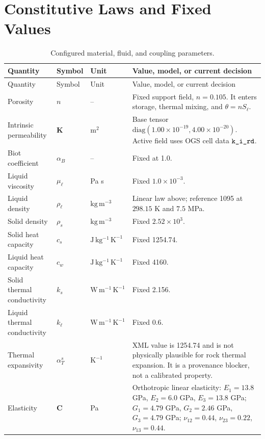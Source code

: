 \documentclass[10pt,a4paper]{article}
\newcommand{\code}[1]{\texttt{\detokenize{#1}}}
\newcommand{\rhoW}{\rho_\ell}
\newcommand{\muW}{\mu_\ell}
\newcommand{\npor}{n}
\newcommand{\Sat}{S_\ell}
\newcommand{\alphaB}{\alpha_B}
\newcommand{\K}{\bm K}
\newcommand{\thetaw}{\theta}
\begin{document}
\section{Constitutive Laws and Fixed Values}

\begin{longtable}{@{}L{0.23\textwidth}L{0.13\textwidth}L{0.14\textwidth}Y@{}}
\caption{Configured material, fluid, and coupling parameters.}\\
\toprule
Quantity & Symbol & Unit & Value, model, or current decision \\
\midrule
\endfirsthead
\toprule
Quantity & Symbol & Unit & Value, model, or current decision \\
\midrule
\endhead
\bottomrule
\endlastfoot
Porosity & \(\npor\) & -- & Fixed support field, \(\npor=0.105\).  It enters storage, thermal mixing, and \(\thetaw=\npor\Sat\). \\
Intrinsic permeability & \(\K\) & \(\mathrm{m^2}\) & Base tensor \(\mathrm{diag}(1.00\times10^{-19},4.00\times10^{-20})\).  Active field uses OGS cell data \(\code{k_i_rd}\). \\
Biot coefficient & \(\alphaB\) & -- & Fixed at 1.0. \\
Liquid viscosity & \(\muW\) & Pa s & Fixed \(1.0\times10^{-3}\). \\
Liquid density & \(\rhoW\) & \(\mathrm{kg\,m^{-3}}\) & Linear law above; reference 1095 at \(298.15\) K and \(7.5\) MPa. \\
Solid density & \(\rho_s\) & \(\mathrm{kg\,m^{-3}}\) & Fixed \(2.52\times10^3\). \\
Solid heat capacity & \(c_s\) & \(\mathrm{J\,kg^{-1}\,K^{-1}}\) & Fixed 1254.74. \\
Liquid heat capacity & \(c_w\) & \(\mathrm{J\,kg^{-1}\,K^{-1}}\) & Fixed 4160. \\
Solid thermal conductivity & \(k_s\) & \(\mathrm{W\,m^{-1}\,K^{-1}}\) & Fixed 2.156. \\
Liquid thermal conductivity & \(k_\ell\) & \(\mathrm{W\,m^{-1}\,K^{-1}}\) & Fixed 0.6. \\
Thermal expansivity & \(\alpha_T^s\) & \(\mathrm{K^{-1}}\) & XML value is 1254.74 and is not physically plausible for rock thermal expansion.  It is a provenance blocker, not a calibrated property. \\
Elasticity & \(\bm C\) & Pa & Orthotropic linear elasticity: \(E_1=13.8\) GPa, \(E_2=6.0\) GPa, \(E_3=13.8\) GPa; \(G_1=4.79\) GPa, \(G_2=2.46\) GPa, \(G_3=4.79\) GPa; \(\nu_{12}=0.44\), \(\nu_{23}=0.22\), \(\nu_{13}=0.44\). \\

\end{longtable}
\end{document}
